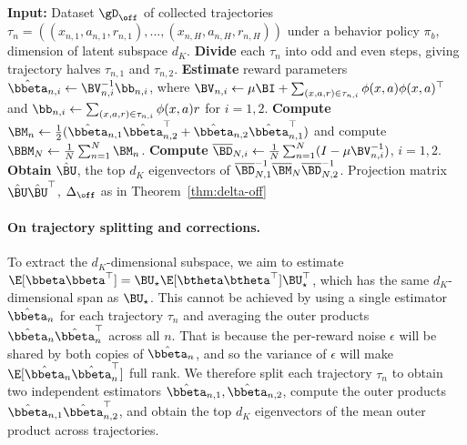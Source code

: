 \begin{algorithm}[htbp!]
\centering
	\caption{}
    	\begin{algorithmic}[1]
	    \STATE \textbf{Input:} Dataset $\gD_{\off}$ of collected trajectories $\tau_n = ((x_{n,1}, a_{n,1}, r_{n,1}),...,(x_{n,H}, a_{n,H}, r_{n,H}))$ under a behavior policy $\pi_b$, dimension of latent subspace $d_K$.
        \STATE \textbf{Divide} each $\tau_n$ into odd and even steps, giving trajectory halves $\tau_{n,1}$ and $\tau_{n,2}$.
        \STATE \textbf{Estimate} reward parameters $\hat \bbeta_{n,i} \gets \BV_{n,i}^{-1} \bb_{n,i}$, where $\BV_{n,i} \gets \mu \BI + \sum_{(x,a,r) \in \tau_{n,i}} \phi(x,a)\phi(x,a)^\top$ and $\bb_{n,i} \gets \sum_{(x,a,r) \in \tau_{n,i}} \phi(x,a) r $ for $i = 1,2$.
        \STATE \textbf{Compute} $\BM_n \gets \frac{1}{2}(\hat \bbeta_{n,1} \hat \bbeta_{n,2}^\top + \hat \bbeta_{n,2} \hat \bbeta_{n,1}^\top)$ and compute $\BBM_N \gets \frac{1}{N}\sum_{n=1}^N \BM_n$.
        \STATE \textbf{Compute} $\overline{\BD}_{N,i} \gets \frac{1}{N} \sum_{n=1}^N (I - \mu\BV_{n,i}^{-1})$, $i=1,2$.
        \STATE \textbf{Obtain} $\hat \BU$, the top $d_K$ eigenvectors of $\overline{\BD}_{N,1}^{-1} {\overline{\BM}_N} {\overline{\BD}_{N,2}^{-1}}$.
		\RETURN Projection matrix $\hat \BU \hat \BU^\top$, $\Delta_{\off}$ as in Theorem~\ref{thm:delta-off}
	\end{algorithmic}
    \label{alg:sold}
\end{algorithm}

 
\paragraph{On trajectory splitting and corrections.} To extract the $d_K$-dimensional subspace, we aim to estimate $\E[\bbeta\bbeta^\top] = \BU_\star\E[\btheta\btheta^\top]\BU_\star^\top$, which has the same $d_K$-dimensional span as $\BU_\star$. This cannot be achieved by using a single estimator $\hat \bbeta_n$ for each trajectory $\tau_n$ and averaging the outer products $\hat \bbeta_n \hat \bbeta_n^\top$ across all $n$. That is because the per-reward noise $\epsilon$ will be shared by both copies of $\hat \bbeta_n$, and so the variance of $\epsilon$ will make $\E[\hat \bbeta_n \hat \bbeta_n^\top]$ full rank. We therefore split each trajectory $\tau_n$ to obtain two independent estimators $\hat\bbeta_{n,1}, \hat\bbeta_{n,2}$, compute the outer products $\hat\bbeta_{n,1} \hat\bbeta_{n,2}^\top$, and obtain the top $d_K$ eigenvectors of the mean outer product across trajectories. 

